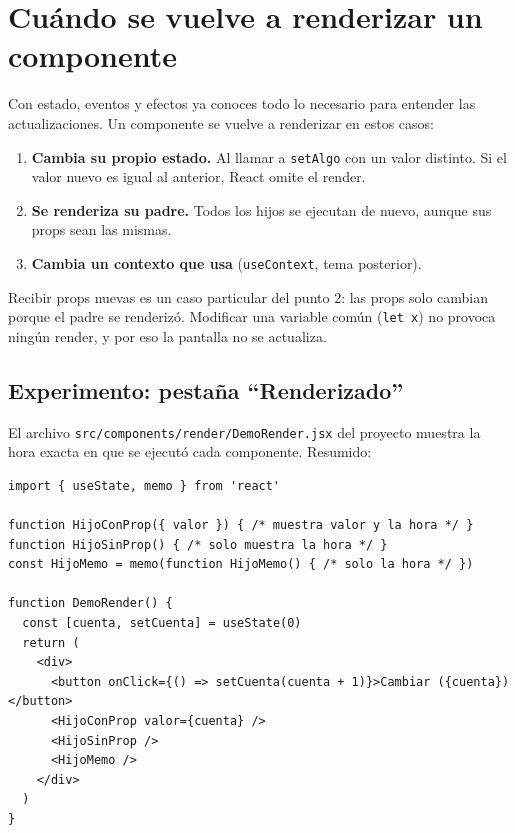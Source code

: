 \documentclass[11pt,a4paper]{article}
\newcommand{\cmd}[1]{\texttt{\color{reactdark}#1}}
\begin{document}
\section{Cuándo se vuelve a renderizar un componente}\label{sec:rerender}

Con estado, eventos y efectos ya conoces todo lo necesario para entender las actualizaciones. Un componente se vuelve a renderizar en estos casos:

\begin{enumerate}[leftmargin=*]
  \item \textbf{Cambia su propio estado.} Al llamar a \cmd{setAlgo} con un valor distinto. Si el valor nuevo es igual al anterior, React omite el render.
  \item \textbf{Se renderiza su padre.} Todos los hijos se ejecutan de nuevo, aunque sus props sean las mismas.
  \item \textbf{Cambia un contexto que usa} (\cmd{useContext}, tema posterior).
\end{enumerate}

Recibir props nuevas es un caso particular del punto 2: las props solo cambian porque el padre se renderizó. Modificar una variable común (\cmd{let x}) no provoca ningún render, y por eso la pantalla no se actualiza.

\subsection{Experimento: pestaña ``Renderizado''}

El archivo \cmd{src/components/render/DemoRender.jsx} del proyecto muestra la hora exacta en que se ejecutó cada componente. Resumido:

\begin{lstlisting}[language=JSX]
import { useState, memo } from 'react'

function HijoConProp({ valor }) { /* muestra valor y la hora */ }
function HijoSinProp() { /* solo muestra la hora */ }
const HijoMemo = memo(function HijoMemo() { /* solo la hora */ })

function DemoRender() {
  const [cuenta, setCuenta] = useState(0)
  return (
    <div>
      <button onClick={() => setCuenta(cuenta + 1)}>Cambiar ({cuenta})</button>
      <HijoConProp valor={cuenta} />
      <HijoSinProp />
      <HijoMemo />
    </div>
  )
}
\end{lstlisting}
\end{document}
